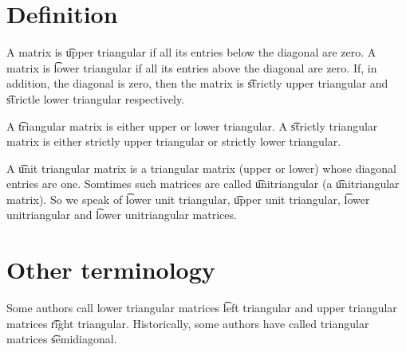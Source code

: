 

\section*{Definition}

A matrix is \t{upper triangular} if all its entries below the diagonal are zero.
A matrix is \t{lower triangular} if all its entries above the diagonal are zero.
If, in addition, the diagonal is zero, then the matrix is \t{strictly upper triangular} and \t{strictle lower triangular} respectively.

A \t{triangular} matrix is either upper or lower triangular.
A \t{strictly triangular} matrix is either strictly upper triangular or strictly lower triangular.

A \t{unit triangular matrix} is a triangular matrix (upper or lower) whose diagonal entries are one.
Somtimes such matrices are called \t{unitriangular} (a \t{unitriangular matrix}).
So we speak of \t{lower unit triangular}, \t{upper unit triangular}, \t{lower unitriangular} and \t{lower unitriangular} matrices.

\section*{Other terminology}

Some authors call lower triangular matrices \t{left triangular} and upper triangular matrices \t{right triangular}.
Historically, some authors have called triangular matrices \t{semidiagonal}.

\blankpage